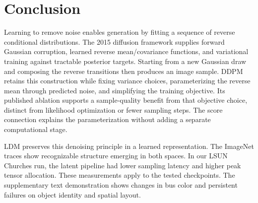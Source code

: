 \section{Conclusion}\label{sec:conclusion}
Learning to remove noise enables generation by fitting a sequence of
reverse conditional distributions. The 2015 diffusion framework supplies
forward Gaussian corruption, learned reverse mean/covariance functions,
and variational training against tractable posterior targets. Starting
from a new Gaussian draw and composing the reverse transitions then
produces an image sample. DDPM retains this construction while fixing
variance choices, parameterizing the reverse mean through predicted
noise, and simplifying the training objective. Its published ablation
supports a sample-quality benefit from that objective choice, distinct
from likelihood optimization or fewer sampling steps. The score
connection explains the parameterization without adding a separate
computational stage.


LDM preserves this denoising principle in a learned representation.
The ImageNet traces show recognizable structure emerging in both spaces.
In our LSUN Churches run, the latent pipeline had lower sampling latency
and higher peak tensor allocation. These measurements apply to the tested
checkpoints. The supplementary text demonstration shows changes in
bus color and persistent failures on object identity and spatial layout.
